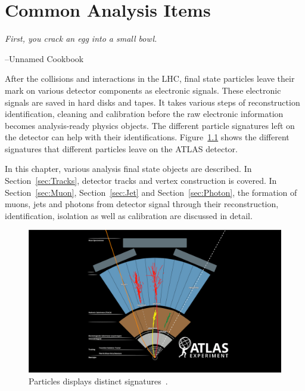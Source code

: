 \chapter{Common Analysis Items}
\label{chapter:common_analysis_items}

\epigraph{\textit{First, you crack an egg into a small bowl.}}{--Unnamed Cookbook}

After the collisions and interactions in the LHC, final state particles leave their mark on various detector components as electronic signals. These electronic signals are saved in hard disks and tapes. It takes various steps of reconstruction identification, cleaning and calibration before the raw electronic information becomes analysis-ready physics objects. The different particle signatures left on the detector can help
with their identifications. Figure~\ref{fig:particleSignature} shows the different signatures that different particles leave on the ATLAS detector.

In this chapter, various analysis final state objects are described. In Section~\ref{sec:Tracks}, detector tracks and vertex construction is covered. In Section~\ref{sec:Muon}, Section~\ref{sec:Jet} and Section~\ref{sec:Photon}, the formation of muons, jets and photons from detector signal
through their reconstruction, identification, isolation as well as calibration are discussed in detail. 

\begin{figure}[!htb]
    \begin{center}
        \includegraphics[width=1.1\textwidth]{figures/common_ana/ParticleSignature}
        \caption{        
            Particles displays distinct signatures~\cite{Mehlhase:2770815}.
        }
        \label{fig:particleSignature}
    \end{center}
\end{figure}

